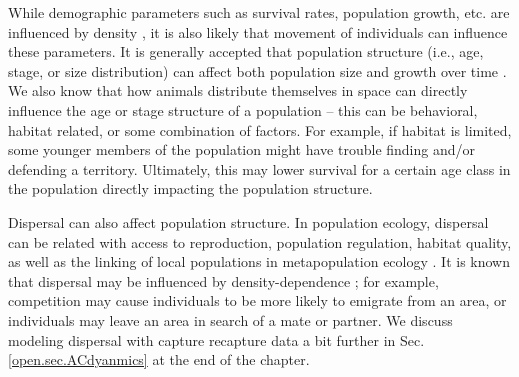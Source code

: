 While demographic parameters such as survival rates, population
growth, etc. are influenced by density \citep{fowler:1981,
  murdoch:1994, saether_etal:2002}, it is also likely that movement
of individuals can influence these parameters.  It is generally
accepted that population structure (i.e., age, stage, or size
distribution) can affect both population size and growth over time
\citep{caswell_werner:1978}.  We also know that how animals distribute
themselves in space can directly influence the age or stage structure
of a population -- this can be behavioral, habitat related, or some
combination of factors.  For example, if habitat is limited, some
younger members of the population might have trouble finding and/or
defending a territory.  Ultimately, this may lower survival for a
certain age class in the population directly impacting the population
structure.

Dispersal can also affect population structure.  In population
ecology, dispersal can be related with access to reproduction,
population regulation, habitat quality, as well as the linking of
local populations in metapopulation ecology \citep{clobert_etal:2001,
  ovaskainen:2004, ovaskainen_etal:2008}.  It is known that dispersal
may be influenced by density-dependence \citep{matthysen:2005}; for
example, competition may cause individuals to be more likely to
emigrate from an area, or individuals may leave
an area in search of a mate or partner.  We discuss modeling dispersal
with capture recapture data a bit further in
Sec. \ref{open.sec.ACdyanmics} at the end of the chapter.



